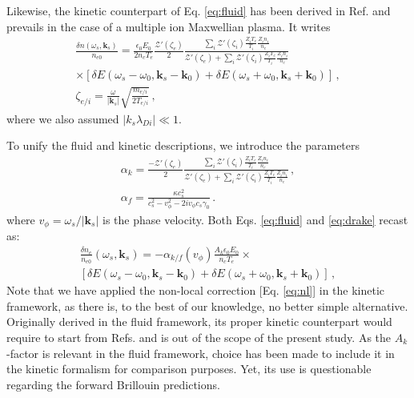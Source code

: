 \documentclass[
 reprint,
 superscriptaddress,
 amsmath,amssymb,
 aps,
]{revtex4-1}
\begin{document}
Likewise, the kinetic counterpart of Eq. \eqref{eq:fluid} has been derived in Ref. \cite[]{POF_Drake_1973} and prevails in the case of a multiple ion Maxwellian plasma. It writes
\begin{align}
 \frac{ \delta n (\omega_s, \mathbf{k}_s ) }{n_{e0}}  =   \frac{ \epsilon_0  E_0 }{ 2n_c T_e } 
 \frac{\mathcal{Z}'( \zeta_e) }{2}
 \frac{\sum_i\mathcal{Z}'( \zeta_i)\frac{  Z_iT_e}{ T_i }\frac{  Z_in_i}{ n_e }   }{  \mathcal{Z}'( \zeta_e)+ \sum_i\mathcal{Z}'( \zeta_i)\frac{  Z_iT_e}{ T_i }\frac{ Z_i n_i}{ n_e }  }
\nonumber\\  \times \left[\delta E(\omega_s-\omega_0, \mathbf{k}_s-\mathbf{k}_0) +\delta E(\omega_s+\omega_0, \mathbf{k}_s+\mathbf{k}_0) \right] %
   \, ,\label{eq:drake}\\
   \zeta_{e/i} = \frac{   \omega }{   \vert\mathbf{k}_s\vert }  \sqrt{ \frac{ m_{e/i } }{ 2T_{e/i }}  }  \label{eq:xi} \, , 
 \end{align}
 where we also assumed $\vert k_s \lambda_{Di} \vert \ll 1$. 

To unify the fluid and kinetic descriptions, we introduce the parameters
\begin{align}
   \alpha_k  = \frac{-\mathcal{Z}'( \zeta_e) }{2}
 \frac{\sum_i\mathcal{Z}'( \zeta_i)\frac{  Z_iT_e}{ T_i }\frac{  Z_in_i}{ n_e }   }{  \mathcal{Z}'( \zeta_e)+ \sum_i\mathcal{Z}'( \zeta_i)\frac{  Z_iT_e}{ T_i }\frac{ Z_i n_i}{ n_e }  }\, ,\label{eq:alphak} \\
   \alpha_f = \frac{\kappa c_s^2}{ c_s^2-v_\phi^2 -2iv_\phi c_s \gamma_0}\, .\label{eq:alphaf}
\end{align}
where $v_\phi = \omega_s/\vert \mathbf{k}_s\vert $ is the phase velocity.
Both Eqs. \eqref{eq:fluid} and  \eqref{eq:drake} recast as:
\begin{align}
   \frac{\delta n_e }{n_{e0}}(\omega_s,\mathbf{k}_s) = -\alpha_{k/f}(v_\phi) \frac{A_k\epsilon_0 E_0}{n_c T_e}\times \nonumber\\ \left[\delta E(\omega_s-\omega_0, \mathbf{k}_s-\mathbf{k}_0) +\delta E(\omega_s+\omega_0, \mathbf{k}_s+\mathbf{k}_0) \right] \, ,\label{eq:fd}
\end{align}
Note that we have  applied the non-local correction [Eq. \eqref{eq:nl}] in the kinetic framework, as there is, to the best of our knowledge,  no better simple alternative. Originally derived in the fluid framework, its proper kinetic counterpart would require to start from Refs. \cite[]{POP_Epperlein_94,POP_Bychenkov_1998} and is out of the scope of the present study. As the $A_k$-factor is relevant in the fluid framework, choice has been made to include it in the kinetic formalism for comparison purposes. Yet, its use is questionable regarding the forward Brillouin predictions.
\end{document}
